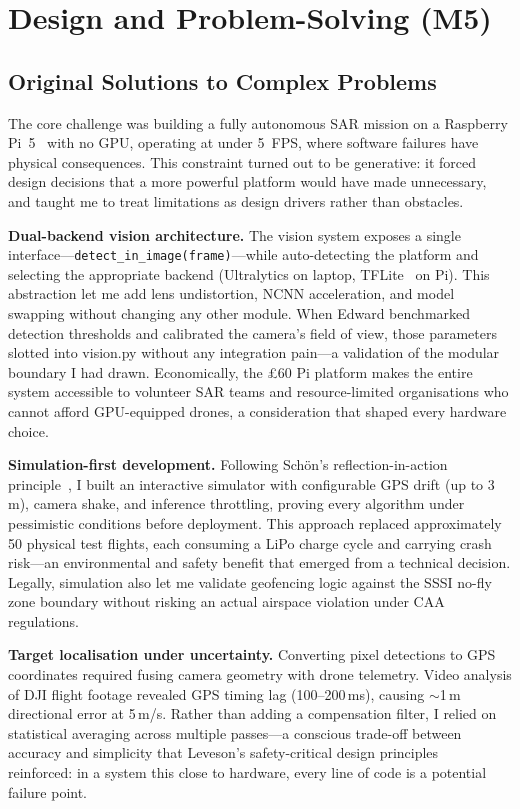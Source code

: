 \section{Design and Problem-Solving (M5)}
\label{sec:design}

\subsection{Original Solutions to Complex Problems}

The core challenge was building a fully autonomous SAR mission on a Raspberry Pi~5~\cite{rpi5} with no GPU, operating at under 5~FPS, where software failures have physical consequences. This constraint turned out to be generative: it forced design decisions that a more powerful platform would have made unnecessary, and taught me to treat limitations as design drivers rather than obstacles.

\textbf{Dual-backend vision architecture.} The vision system exposes a single interface---\texttt{detect\_in\_image(frame)}---while auto-detecting the platform and selecting the appropriate backend (Ultralytics on laptop, TFLite~\cite{tflite} on Pi). This abstraction let me add lens undistortion, NCNN acceleration, and model swapping without changing any other module. When Edward benchmarked detection thresholds and calibrated the camera's field of view, those parameters slotted into vision.py without any integration pain---a validation of the modular boundary I had drawn. Economically, the \pounds60 Pi platform makes the entire system accessible to volunteer SAR teams and resource-limited organisations who cannot afford GPU-equipped drones, a consideration that shaped every hardware choice.

\textbf{Simulation-first development.} Following Sch{\"o}n's reflection-in-action principle~\cite{schon1983}, I built an interactive simulator with configurable GPS drift (up to 3\,m), camera shake, and inference throttling, proving every algorithm under pessimistic conditions before deployment. This approach replaced approximately 50 physical test flights, each consuming a LiPo charge cycle and carrying crash risk---an environmental and safety benefit that emerged from a technical decision. Legally, simulation also let me validate geofencing logic against the SSSI no-fly zone boundary without risking an actual airspace violation under CAA regulations.

\textbf{Target localisation under uncertainty.} Converting pixel detections to GPS coordinates required fusing camera geometry with drone telemetry. Video analysis of DJI flight footage revealed GPS timing lag (100--200\,ms), causing ${\sim}$1\,m directional error at 5\,m/s. Rather than adding a compensation filter, I relied on statistical averaging across multiple passes---a conscious trade-off between accuracy and simplicity that Leveson's safety-critical design principles~\cite{leveson2011} reinforced: in a system this close to hardware, every line of code is a potential failure point.

